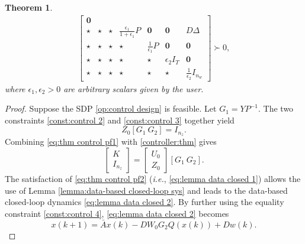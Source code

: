 \documentclass[letterpaper, 10 pt, conference]{ieeeconf}
\newtheorem{theorem}{Theorem}[section]
\begin{document}
\begin{theorem}
\begin{subequations}
\begin{align}
\begin{bmatrix}
					\mathbf{0} \\
					\star & \star & \star & \frac{\epsilon_1}{1 + \epsilon_1} P & \mathbf{0} & \mathbf{0} & D \Delta \\
					\star & \star & \star & \star & \frac{1}{\epsilon_1} P & \mathbf{0} & \mathbf{0}\\
					\star &  \star & \star & \star & \star & \epsilon_2 I_T & \mathbf{0} \\
					\star & \star & \star & \star & \star & \star & \frac{1}{\epsilon_2} I_{n_w}
				\end{bmatrix}
				\succ 0,
			\end{align}
		\end{subequations}	
		where $\epsilon_1, \epsilon_2 > 0$ are arbitrary scalars given by the user. 
	\end{theorem}
	\begin{proof}
		Suppose the SDP \eqref{op:control design} is feasible. Let $G_1 = Y P^{-1}$. The two constraints \eqref{const:control 2} and \eqref{const:control 3} together yield
		\begin{equation}\label{eq:thm control pf1}
			Z_0 [G_1 ~ G_2] = I_{n_z}.	
		\end{equation}
		Combining \eqref{eq:thm control pf1} with \eqref{controller:thm} gives
		\begin{equation}\label{eq:thm control pf2}
			\begin{bmatrix} K \\ I_{n_z}\end{bmatrix} = 
			\begin{bmatrix} U_0 \\ Z_0 \end{bmatrix} [G_1 ~ G_2].
		\end{equation}
		The satisfaction of \eqref{eq:thm control pf2} (\textit{i.e.}, \eqref{eq:lemma data closed 1}) allows the use of Lemma \ref{lemma:data-based closed-loop sys} and leads to the data-based closed-loop dynamics \eqref{eq:lemma data closed 2}. By further using the equality constraint
		\eqref{const:control 4}, \eqref{eq:lemma data closed 2} becomes
		\begin{equation}\label{eq:thm control pf4}
			x(k+1) = \bar{A} x(k) - D W_0 G_2 Q(x(k)) + D w(k).
		\end{equation}
		

\end{proof}
\end{document}
